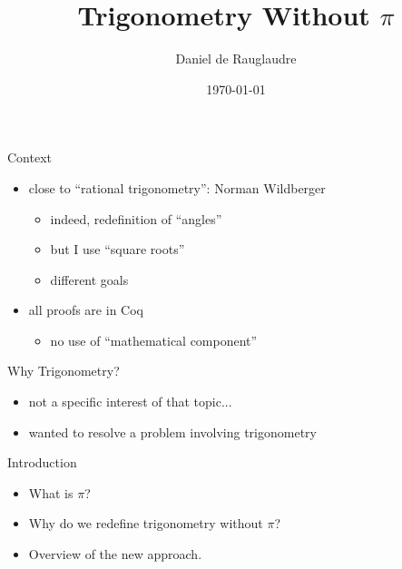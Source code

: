\documentclass{beamer}
\title{Trigonometry Without $\pi$}
\author{Daniel de Rauglaudre}
\date{\today}
\begin{document}
\begin{frame}
    \titlepage
\end{frame}

\begin{frame}{}
\end{frame}

\begin{frame}{Context}
  \begin{itemize}
    \item close to ``rational trigonometry'':  Norman Wildberger
      \begin{itemize}
      \item indeed, redefinition of ``angles''
      \item but I use ``square roots''
      \item different goals
      \end{itemize}
    \item all proofs are in Coq
      \begin{itemize}
      \item no use of ``mathematical component''
      \end{itemize}
  \end{itemize}
\end{frame}

\begin{frame}{Why Trigonometry?}
  \begin{itemize}
  \item not a specific interest of that topic...
  \item wanted to resolve a problem involving trigonometry
  \end{itemize}
\end{frame}

\begin{frame}{Introduction}
    \begin{itemize}
        \item What is $\pi$?
        \item Why do we redefine trigonometry without $\pi$?
        \item Overview of the new approach.
    \end{itemize}
\end{frame}
\end{document}
